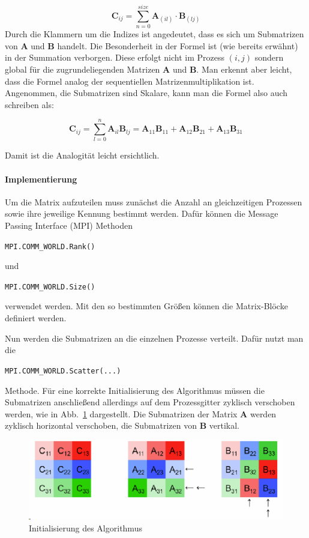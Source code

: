 \documentclass[
ngerman,
ruledheaders=section,
class=report,
thesis={type=Dokumentation},
ignore-missing-data=true,
accentcolor=9c,
custommargins=false,
marginpar=false,
parskip=half-,
fontsize=11pt,
]{tudapub}
\let\code\texttt
\def\code#1{\begin{small}\texttt{#1}\end{small}}
\begin{document}
	\begin{equation}
		\textbf{C}_{ij}=\sum_{n=0}^{size} \textbf{A}_{(il)} \cdot \textbf{B}_{(lj)}
	\end{equation}
	Durch die Klammern um die Indizes ist angedeutet, dass es sich um Submatrizen von $\textbf{A}$ und $\textbf{B}$ handelt. Die Besonderheit in der Formel ist (wie bereits erwähnt) in der Summation verborgen. Diese erfolgt nicht im Prozess $(i,j)$ sondern global für die zugrundeliegenden Matrizen $\textbf{A}$ und  $\textbf{B}$. Man erkennt aber leicht, dass die Formel analog der sequentiellen Matrizenmultiplikation ist. Angenommen, die Submatrizen sind Skalare, kann man die Formel also auch schreiben als:
	
	\begin{equation}
		\textbf{C}_{ij}=\sum_{l=0}^{n} \textbf{A}_{il}\textbf{B}_{lj}
		= \textbf{A}_{11}\textbf{B}_{11} + \textbf{A}_{12}\textbf{B}_{21} + \textbf{A}_{13}\textbf{B}_{31}
	\end{equation}
	
	Damit ist die Analogität leicht ersichtlich.
	
	\paragraph{Implementierung}
	Um die Matrix aufzuteilen muss zunächst die Anzahl an gleichzeitigen Prozessen sowie ihre jeweilige Kennung bestimmt werden. Dafür können die Message Passing Interface (MPI) Methoden \code{MPI.COMM\_WORLD.Rank()} und \code{MPI.COMM\_WORLD.Size()} verwendet werden. Mit den so bestimmten Größen können die Matrix-Blöcke definiert werden.
	
	Nun werden die Submatrizen an die einzelnen Prozesse verteilt. Dafür nutzt man die \code{MPI.COMM\_WORLD.Scatter(...)} Methode. Für eine korrekte Initialisierung des Algorithmus müssen die Submatrizen anschließend allerdings auf dem Prozessgitter zyklisch verschoben werden, wie in Abb.~\ref{fig:cannon-init} dargestellt. Die Submatrizen der Matrix $\textbf{A}$ werden zyklisch horizontal verschoben, die Submatrizen von $\textbf{B}$ vertikal.
	
	\begin{figure}[H]
		\centering
		\includegraphics[width=0.7\linewidth]{content/cannon-init}
		\caption{Initialisierung des Algorithmus}
		\label{fig:cannon-init}
	\end{figure}
	
\end{document}

